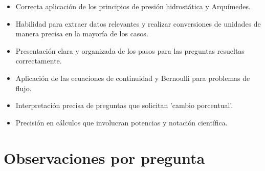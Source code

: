 \documentclass[11pt,a4paper]{article}
\begin{document}
\vspace{4pt}
\begin{minipage}[t]{0.48\linewidth}
  \begin{tcolorbox}[cajaFortaleza, title={Fortalezas}]
\begin{itemize}[leftmargin=1.5em, itemsep=2pt]
  \item Correcta aplicación de los principios de presión hidrostática y Arquímedes.
  \item Habilidad para extraer datos relevantes y realizar conversiones de unidades de manera precisa en la mayoría de los casos.
  \item Presentación clara y organizada de los pasos para las preguntas resueltas correctamente.
\end{itemize}
  \end{tcolorbox}
\end{minipage}
\hfill
\begin{minipage}[t]{0.48\linewidth}
  \begin{tcolorbox}[cajaMejora, title={Areas de mejora}]
\begin{itemize}[leftmargin=1.5em, itemsep=2pt]
  \item Aplicación de las ecuaciones de continuidad y Bernoulli para problemas de flujo.
  \item Interpretación precisa de preguntas que solicitan 'cambio porcentual'.
  \item Precisión en cálculos que involucran potencias y notación científica.
\end{itemize}
  \end{tcolorbox}
\end{minipage}

\section*{Observaciones por pregunta}
\end{document}
